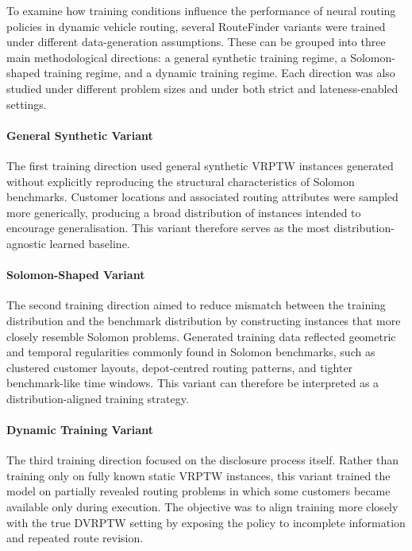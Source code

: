 To examine how training conditions influence the performance of neural routing
policies in dynamic vehicle routing, several RouteFinder variants were trained
under different data-generation assumptions. These can be grouped into three
main methodological directions: a general synthetic training regime, a
Solomon-shaped training regime, and a dynamic training regime. Each direction
was also studied under different problem sizes and under both strict and
lateness-enabled settings.

\paragraph{General Synthetic Variant}

The first training direction used general synthetic VRPTW instances generated
without explicitly reproducing the structural characteristics of Solomon
benchmarks. Customer locations and associated routing attributes were sampled
more generically, producing a broad distribution of instances intended to
encourage generalisation. This variant therefore serves as the most
distribution-agnostic learned baseline.

\paragraph{Solomon-Shaped Variant}

The second training direction aimed to reduce mismatch between the training
distribution and the benchmark distribution by constructing instances that more
closely resemble Solomon problems. Generated training data reflected geometric
and temporal regularities commonly found in Solomon benchmarks, such as
clustered customer layouts, depot-centred routing patterns, and tighter
benchmark-like time windows. This variant can therefore be interpreted as a
distribution-aligned training strategy.

\paragraph{Dynamic Training Variant}

The third training direction focused on the disclosure process itself. Rather
than training only on fully known static VRPTW instances, this variant trained
the model on partially revealed routing problems in which some customers became
available only during execution. The objective was to align training more
closely with the true DVRPTW setting by exposing the policy to incomplete
information and repeated route revision.

